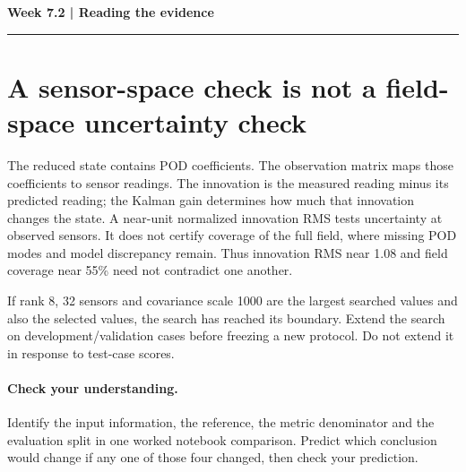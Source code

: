 \documentclass[11pt]{article}
\begin{document}
\noindent\textbf{Week 7.2 | Reading the evidence}\par\medskip\hrule\medskip
\section*{A sensor-space check is not a field-space uncertainty check}
The reduced state contains POD coefficients. The observation matrix maps those
coefficients to sensor readings. The innovation is the measured reading minus
its predicted reading; the Kalman gain determines how much that innovation
changes the state. A near-unit normalized innovation RMS tests uncertainty at
observed sensors. It does not certify coverage of the full field, where missing
POD modes and model discrepancy remain. Thus innovation RMS near 1.08 and field
coverage near 55\% need not contradict one another.

If rank 8, 32 sensors and covariance scale 1000 are the largest searched values
and also the selected values, the search has reached its boundary. Extend the
search on development/validation cases before freezing a new protocol. Do not
extend it in response to test-case scores.
\paragraph{Check your understanding.}
Identify the input information, the reference, the metric denominator and the
evaluation split in one worked notebook comparison. Predict which conclusion
would change if any one of those four changed, then check your prediction.
\end{document}
